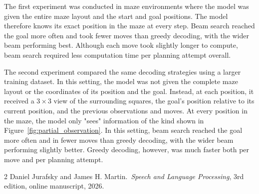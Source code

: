 \documentclass[12pt,a4paper]{article}
\begin{document}
	The first experiment was conducted in maze environments where the model was given 
	the entire maze layout and the start and goal positions.
	The model therefore knows its exact position in the maze at every step.
	Beam search reached the goal more often and took fewer moves than greedy decoding,
	with the wider beam performing best. Although each move took slightly longer to compute,
	beam search required less computation time per planning attempt overall.

	The second experiment compared the same decoding strategies using a larger training dataset.
	In this setting, the model was not given
	the complete maze layout or the coordinates of its position and the goal. 
	Instead, at each position, it received a $3\times3$ view of the surrounding squares, the goal’s 
	position relative to its current position, and the previous observations and moves. 
	At every position in the maze, the model only "sees" information of the kind shown in 
	Figure~\ref{fig:partial_observation}.  
	In this setting, beam search reached the goal more often and in fewer moves than
	greedy decoding, with the wider beam performing slightly better. Greedy decoding,
	however, was much faster both per move and per planning attempt.

	\begin{thebibliography}{2}
		Daniel Jurafsky and James H. Martin.\ \textit{Speech and Language Processing}, 3rd edition, online manuscript, 2026.
	\end{thebibliography}


	
	
	
	
	
	
	

	
\end{document}
